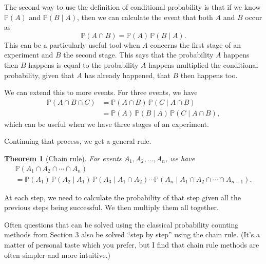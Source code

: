 \documentclass[
  a4paper,
]{book}
\newtheorem{theorem}{Theorem}[chapter]
\theoremstyle{definition}
\theoremstyle{definition}
\theoremstyle{definition}
\theoremstyle{definition}
\theoremstyle{remark}
\begin{document}
The second way to use the definition of conditional probability is that if we know \(\mathbb P(A)\) and \(\mathbb P(B \mid A)\), then we can calculate the event that both \(A\) and \(B\) occur as
\[ \mathbb P(A \cap B) = \mathbb P(A)\, \mathbb P(B \mid A). \]
This can be a particularly useful tool when \(A\) concerns the first stage of an experiment and \(B\) the second stage. This says that the probability \(A\) happens then \(B\) happens is equal to the probability \(A\) happens multiplied the conditional probability, given that \(A\) has already happened, that \(B\) then happens too.

We can extend this to more events. For three events, we have
\begin{align*}
\mathbb P(A \cap B \cap C)
  &= \mathbb P(A \cap B) \, \mathbb P(C \mid A \cap B) \\
  &= \mathbb P(A) \, \mathbb P(B \mid A)\, \mathbb P(C \mid A \cap B) ,
\end{align*}
which can be useful when we have three stages of an experiment.

Continuing that process, we get a general rule.

\begin{theorem}[Chain rule]
\protect\hypertarget{thm:thchain}{}\label{thm:thchain}For events \(A_1, A_2, \dots, A_n\), we have
\begin{multline*}  \mathbb P(A_1 \cap A_2 \cap \cdots \cap A_n) \\
  = \mathbb P(A_1) \, \mathbb P(A_2 \mid A_1) \, \mathbb P(A_3 \mid A_1 \cap A_2) \cdots \mathbb P(A_n \mid A_1 \cap A_2 \cap \cdots \cap  A_{n-1}) .\end{multline*}
\end{theorem}

At each step, we need to calculate the probability of that step given all the previous steps being successful. We then multiply them all together.

Often questions that can be solved using the classical probability counting methods from Section 3 also be solved ``step by step'' using the chain rule. (It's a matter of personal taste which you prefer, but I find that chain rule methods are often simpler and more intuitive.)
\end{document}
